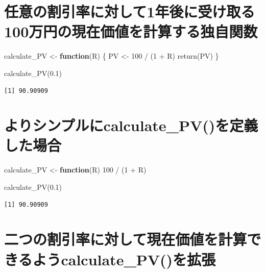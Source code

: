 \documentclass[
  letterpaper,
  DIV=11,
  numbers=noendperiod]{scrreprt}
\newenvironment{Shaded}{\begin{snugshade}}{\end{snugshade}}
\newcommand{\ControlFlowTok}[1]{\textcolor[rgb]{0.00,0.23,0.31}{\textbf{#1}}}
\newcommand{\DecValTok}[1]{\textcolor[rgb]{0.68,0.00,0.00}{#1}}
\newcommand{\FloatTok}[1]{\textcolor[rgb]{0.68,0.00,0.00}{#1}}
\newcommand{\FunctionTok}[1]{\textcolor[rgb]{0.28,0.35,0.67}{#1}}
\newcommand{\NormalTok}[1]{\textcolor[rgb]{0.00,0.23,0.31}{#1}}
\newcommand{\OtherTok}[1]{\textcolor[rgb]{0.00,0.23,0.31}{#1}}
\newcommand{\SpecialCharTok}[1]{\textcolor[rgb]{0.37,0.37,0.37}{#1}}
\begin{document}
\section{任意の割引率に対して1年後に受け取る100万円の現在価値を計算する独自関数}\label{ux4efbux610fux306eux5272ux5f15ux7387ux306bux5bfeux3057ux30661ux5e74ux5f8cux306bux53d7ux3051ux53d6ux308b100ux4e07ux5186ux306eux73feux5728ux4fa1ux5024ux3092ux8a08ux7b97ux3059ux308bux72ecux81eaux95a2ux6570}

\begin{Shaded}
\begin{Highlighting}[]
\NormalTok{calculate\_PV }\OtherTok{\textless{}{-}} \ControlFlowTok{function}\NormalTok{(R) \{}
\NormalTok{  PV }\OtherTok{\textless{}{-}} \DecValTok{100} \SpecialCharTok{/}\NormalTok{ (}\DecValTok{1} \SpecialCharTok{+}\NormalTok{ R)}
  \FunctionTok{return}\NormalTok{(PV)}
\NormalTok{\}}

\FunctionTok{calculate\_PV}\NormalTok{(}\FloatTok{0.1}\NormalTok{)}
\end{Highlighting}
\end{Shaded}

\begin{verbatim}
[1] 90.90909
\end{verbatim}

\section{よりシンプルにcalculate\_PV()を定義した場合}\label{ux3088ux308aux30b7ux30f3ux30d7ux30ebux306bcalculate_pvux3092ux5b9aux7fa9ux3057ux305fux5834ux5408}

\begin{Shaded}
\begin{Highlighting}[]
\NormalTok{calculate\_PV }\OtherTok{\textless{}{-}} \ControlFlowTok{function}\NormalTok{(R) }\DecValTok{100} \SpecialCharTok{/}\NormalTok{ (}\DecValTok{1} \SpecialCharTok{+}\NormalTok{ R) }

\FunctionTok{calculate\_PV}\NormalTok{(}\FloatTok{0.1}\NormalTok{)}
\end{Highlighting}
\end{Shaded}

\begin{verbatim}
[1] 90.90909
\end{verbatim}

\section{二つの割引率に対して現在価値を計算できるようcalculate\_PV()を拡張}\label{ux4e8cux3064ux306eux5272ux5f15ux7387ux306bux5bfeux3057ux3066ux73feux5728ux4fa1ux5024ux3092ux8a08ux7b97ux3067ux304dux308bux3088ux3046calculate_pvux3092ux62e1ux5f35}
\end{document}
